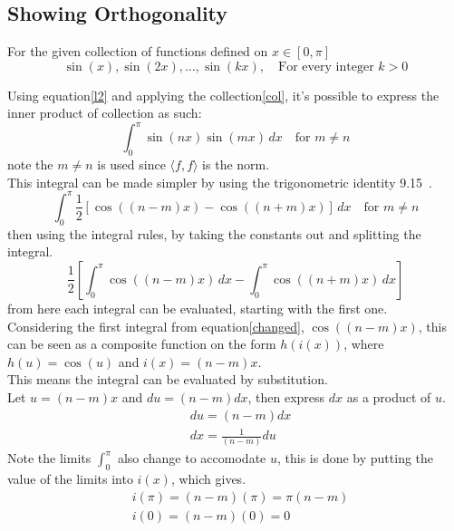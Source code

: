 \documentclass[12pt]{article}
\begin{document}
\subsection*{Showing Orthogonality}
For the given collection of functions defined on $x \in [0,\pi]$
\begin{equation} \label{col}
    \sin(x),\sin(2x),\hdots ,\sin(kx), \quad \text{For every integer } k > 0
\end{equation}

\noindent Using equation\eqref{l2} and applying the collection\eqref{col}, it's possible to express the inner product of collection as such:
\begin{equation}
    \int_{0}^{\pi} \sin(nx)\sin(mx) \, dx \quad \text{for }m \neq n 
\end{equation}
note the $m\neq n$ is used since $ \langle f,f \rangle$ is the norm.\\
This integral can be made simpler by using the trigonometric identity 9.15~\cite{NUMLA}.
\begin{equation*}
     \int_{0}^{\pi} \frac{1}{2}[\cos((n-m)x)-\cos((n+m)x)] \, dx \quad \text{for }m \neq n 
\end{equation*}
then using the integral rules, by taking the constants out and splitting the integral.
\begin{equation} \label{changed}
    \frac{1}{2}[
        \int_{0}^{\pi} \cos((n-m)x) \, dx - \int_{0}^{\pi} \cos((n+m)x) \, dx
    ]
\end{equation}
 from here each integral can be evaluated, starting with the first one.\\
 Considering the first integral from equation\eqref{changed}, $\cos((n-m)x)$, this can be seen as a composite function on the form $h(i(x))$, where $h(u) = \cos(u)$ and $i(x) = (n-m)x$.\\
 This means the integral can be evaluated by substitution.\\ 
 Let $u = (n-m)x$ and $du = (n-m)dx$, then express $dx$ as a product of $u$.
 \begin{align*}
    &du = (n-m)dx \\
    &dx = \frac{1}{(n-m)}du
 \end{align*}
Note the limits $\int_{0}^{\pi}$ also change to accomodate $u$, this is done by putting the value of the limits into $i(x)$, which gives.
\begin{align*}
    &i(\pi) = (n-m)(\pi) = \pi(n-m) \\
    &i(0) = (n-m)(0) = 0
\end{align*}
\end{document}
